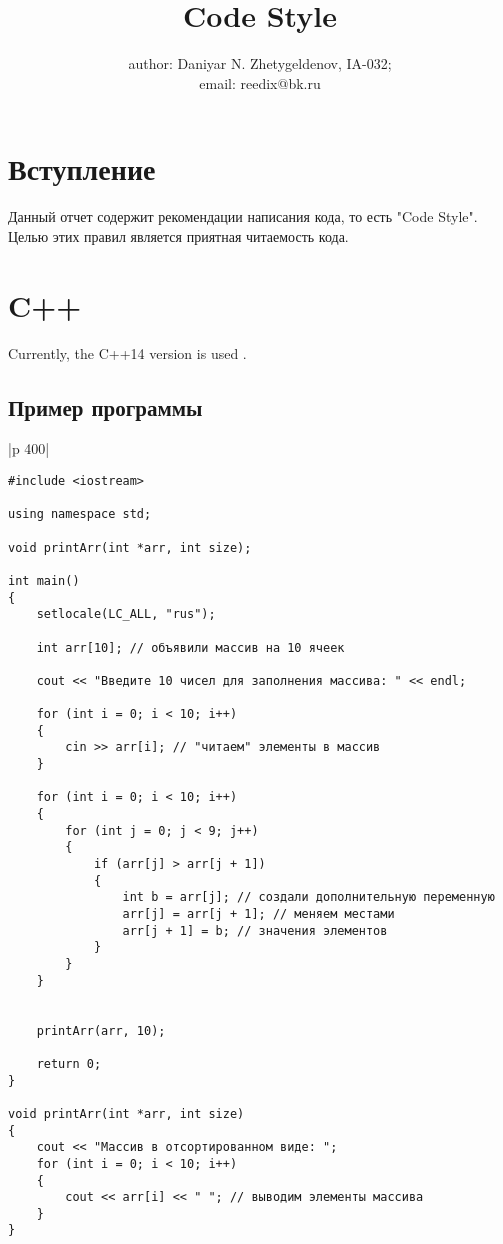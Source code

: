 \documentclass{article}
\title{Code Style}
\author{author: Daniyar N. Zhetygeldenov, IA-032;\\ email: reedix@bk.ru}
\begin{document}
\maketitle

\section{Вступление}
Данный отчет содержит рекомендации написания кода, то есть "Code Style". 
Целью этих правил является приятная читаемость кода. 
\section{C++}
Currently, the C++14 version is used \cite{CPP}.
\subsection{Пример программы}

\begin{tabular}{|p {400}|}
\hline
\\
\begin{verbatim}
#include <iostream>
 
using namespace std;

void printArr(int *arr, int size);

int main() 
{
    setlocale(LC_ALL, "rus");
 
    int arr[10]; // объявили массив на 10 ячеек
 
    cout << "Введите 10 чисел для заполнения массива: " << endl;
 
    for (int i = 0; i < 10; i++) 
    {
        cin >> arr[i]; // "читаем" элементы в массив
    }
 
    for (int i = 0; i < 10; i++) 
    {
        for (int j = 0; j < 9; j++) 
        {
            if (arr[j] > arr[j + 1]) 
            {
                int b = arr[j]; // создали дополнительную переменную
                arr[j] = arr[j + 1]; // меняем местами
                arr[j + 1] = b; // значения элементов
            }
        }
    }
 
    
    printArr(arr, 10);

    return 0;
}

void printArr(int *arr, int size)
{
    cout << "Массив в отсортированном виде: ";
    for (int i = 0; i < 10; i++) 
    {
        cout << arr[i] << " "; // выводим элементы массива
    }
}
\end{verbatim}
\\
\hline      
\end{tabular}
\end{document}
